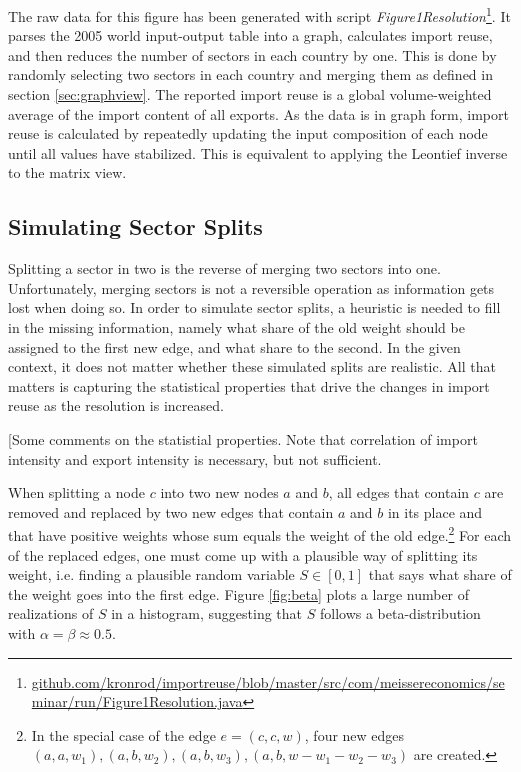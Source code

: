 \documentclass[english]{uzhpub}
\begin{document}
The raw data for this figure has been generated with script \emph{Figure1Resolution}\footnote{\href{https://github.com/kronrod/importreuse/blob/master/src/com/meissereconomics/seminar/run/Figure1Resolution.java}{github.com/kronrod/importreuse/blob/master/src/com/meissereconomics/seminar/run/Figure1Resolution.java}}. It parses the 2005 world input-output table into a graph, calculates import reuse, and then reduces the number of sectors in each country by one. This is done by randomly selecting two sectors in each country and merging them as defined in section \ref{sec:graphview}. The reported import reuse is a global volume-weighted average of the import content of all exports. As the data is in graph form, import reuse is calculated by repeatedly updating the input composition of each node until all values have stabilized. This is equivalent to applying the Leontief inverse to the matrix view.

\subsection{Simulating Sector Splits}
Splitting a sector in two is the reverse of merging two sectors into one. Unfortunately, merging sectors is not a reversible operation as information gets lost when doing so. In order to simulate sector splits, a heuristic is needed to fill in the missing information, namely what share of the old weight should be assigned to the first new edge, and what share to the second. In the given context, it does not matter whether these simulated splits are realistic. All that matters is capturing the statistical properties that drive the changes in import reuse as the resolution is increased.

[Some comments on the statistial properties. Note that correlation of import intensity and export intensity is necessary, but not sufficient.

When splitting a node $c$ into two new nodes $a$ and $b$, all edges that contain $c$ are removed and replaced by two new edges that contain $a$ and $b$ in its place and that have positive weights whose sum equals the weight of the old edge.\footnote{In the special case of the edge $e=(c, c, w)$, four new edges $(a, a, w_1), (a, b, w_2), (a, b, w_3), (a, b, w - w_1 - w_2 - w_3)$ are created.} For each of the replaced edges, one must come up with a plausible way of splitting its weight, i.e. finding a plausible random variable $S \in [0,1]$  that says what share of the weight goes into the first edge. Figure \ref{fig:beta} plots a large number of realizations of $S$ in a histogram, suggesting that $S$ follows a beta-distribution with $\alpha=\beta\approx0.5$.
\end{document}
